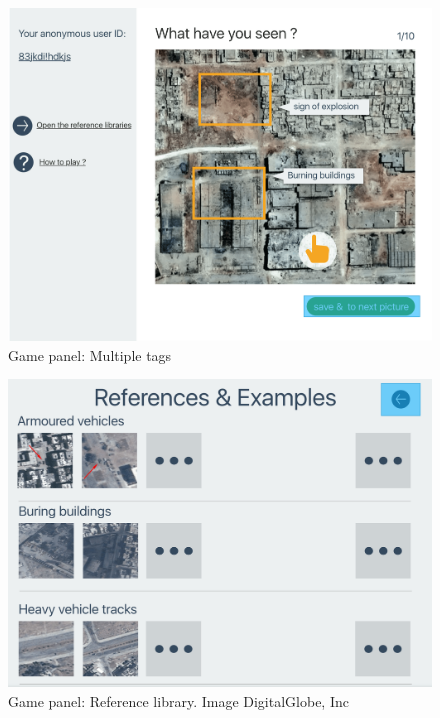       \noindent\begin{minipage}{.45\textwidth}
      \begin{figure}[H]
      \centering
      \includegraphics[width=\textwidth]{figures/function-player-2}
      \caption{Game panel: Multiple tags\cite{satellite-photo-1}}
      \label{fig:player2}
      \end{figure}
      \end{minipage}\hfill
      \noindent\begin{minipage}{.45\textwidth}
      \begin{figure}[H]
      \centering
      \includegraphics[width=\textwidth]{figures/function-player-3}
      \caption{Game panel: Reference library. Image \textcopyright DigitalGlobe, Inc}
      \label{fig:player3}
      \end{figure}
      \end{minipage}\hfill

